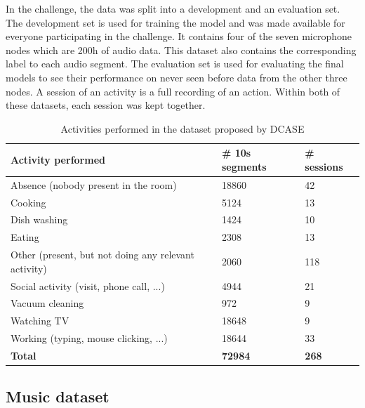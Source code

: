 \newline
\newline
In the challenge, the data was split into a development and an evaluation set. The development set is used for training the model and was made available for everyone participating in the challenge. It contains four of the seven microphone nodes which are 200h of audio data. This dataset also contains the corresponding label to each audio segment. The evaluation set is used for evaluating the final models to see their performance on never seen before data from the other three nodes. A session of an activity is a full recording of an action. Within both of these datasets, each session was kept together.
\begin{table}[htbp]
    \centering
    \caption[Activities performed in the dataset proposed by DCASE]{Activities performed in the dataset proposed by DCASE \footnotemark}
	\label{tab:DCASE-activiies-performed}
    \begin{tabular}{l|l|l}
        \toprule
        \textbf{Activity performed} & \textbf{\# 10s segments} & \textbf{\# sessions} \\ 
        \midrule[1pt]
        Absence (nobody present in the room) & 18860 & 42 \\
        \hline
        Cooking & 5124 & 13 \\ 
        \hline
        Dish washing & 1424 & 10 \\ 
        \hline
        Eating & 2308 & 13 \\ 
        \hline
        Other (present, but not doing any relevant activity) & 2060 & 118 \\ 
        \hline
        Social activity (visit, phone call, ...) & 4944 & 21 \\ 
        \hline
        Vacuum cleaning & 972 & 9 \\ 
        \hline
        Watching TV & 18648 & 9 \\ 
        \hline
        Working (typing, mouse clicking, ...) & 18644 & 33 \\ 
        \midrule[1pt]
        \textbf{Total} & \textbf{72984} & \textbf{268} \\
        \bottomrule
    \end{tabular}
\end{table}

\subsection{Music dataset}
\label{sub:Music-Dataset}

